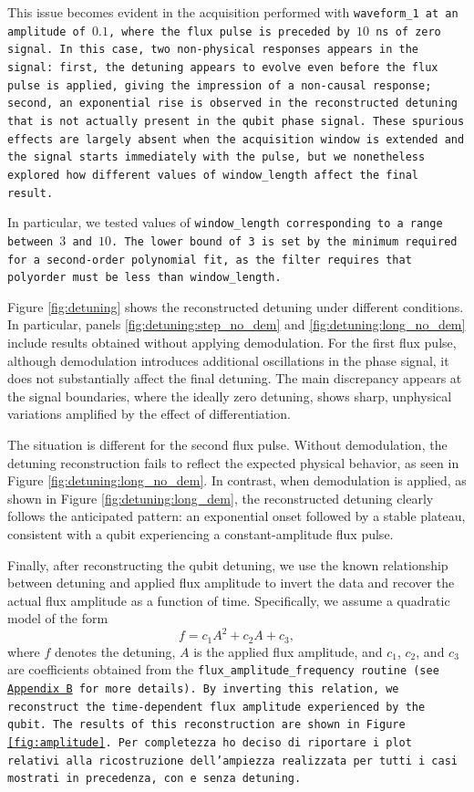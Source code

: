 This issue becomes evident in the acquisition performed with \tt{waveform\_1} at an amplitude of $0.1$, where the flux pulse is preceded by $10$ ns of zero signal. 
In this case, two non-physical responses appears in the signal: first, the detuning appears to evolve even before the flux pulse is applied, giving the impression of a non-causal response; second, an exponential rise is observed in the reconstructed detuning that is not actually present in the qubit phase signal. 
These spurious effects are largely absent when the acquisition window is extended and the signal starts immediately with the pulse, but we nonetheless explored how different values of \texttt{window\_length} affect the final result.

In particular, we tested values of \tt{window\_length} corresponding to a range between $3$ and $10$. 
The lower bound of 3 is set by the minimum required for a second-order polynomial fit, as the filter requires that \tt{polyorder} must be less than \tt{window\_length}.

Figure \ref{fig:detuning} shows the reconstructed detuning under different conditions. 
In particular, panels \ref{fig:detuning:step_no_dem} and \ref{fig:detuning:long_no_dem} include results obtained without applying demodulation. 
For the first flux pulse, although demodulation introduces additional oscillations in the phase signal, it does not substantially affect the final detuning.
The main discrepancy appears at the signal boundaries, where the ideally zero detuning, shows sharp, unphysical variations amplified by the effect of differentiation.

The situation is different for the second flux pulse. 
Without demodulation, the detuning reconstruction fails to reflect the expected physical behavior, as seen in Figure \ref{fig:detuning:long_no_dem}. 
In contrast, when demodulation is applied, as shown in Figure \ref{fig:detuning:long_dem}, the reconstructed detuning clearly follows the anticipated pattern: an exponential onset followed by a stable plateau, consistent with a qubit experiencing a constant-amplitude flux pulse.

Finally, after reconstructing the qubit detuning, we use the known relationship between detuning and applied flux amplitude to invert the data and recover the actual flux amplitude as a function of time. 
Specifically, we assume a quadratic model of the form
\begin{equation}
    f = c_1 A^2 + c_2 A + c_3,
\end{equation}
where $f$ denotes the detuning, $A$ is the applied flux amplitude, and $c_1$, $c_2$, and $c_3$ are coefficients obtained from the \tt{flux\_amplitude\_frequency} routine (see \hyperref[app:AppendixB]{Appendix B} for more details). 
By inverting this relation, we reconstruct the time-dependent flux amplitude experienced by the qubit. 
The results of this reconstruction are shown in Figure \ref{fig:amplitude}.
Per completezza ho deciso di riportare i plot relativi alla ricostruzione dell'ampiezza realizzata per tutti i casi mostrati in precedenza, con e senza detuning.

